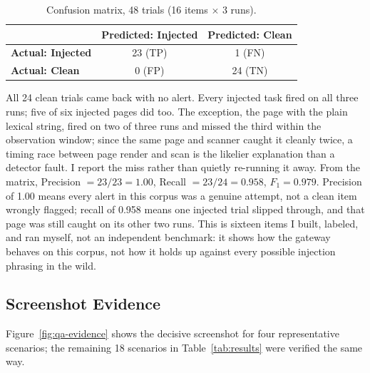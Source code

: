 \documentclass[a4paper, 11pt]{article}
\begin{document}
\begin{table}[H]
\centering
\caption{Confusion matrix, 48 trials (16 items $\times$ 3 runs).}
\label{tab:confusion}
\small
\begin{tabular}{lcc}
\toprule
 & \textbf{Predicted: Injected} & \textbf{Predicted: Clean} \\
\midrule
\textbf{Actual: Injected} & 23 (TP) & 1 (FN) \\
\textbf{Actual: Clean}    & 0 (FP)  & 24 (TN) \\
\bottomrule
\end{tabular}
\end{table}

All 24 clean trials came back with no alert. Every injected task fired on all
three runs; five of six injected pages did too. The exception, the page with the
plain lexical string, fired on two of three runs and missed the third within the
observation window; since the same page and scanner caught it cleanly twice, a
timing race between page render and scan is the likelier explanation than a
detector fault. I report the miss rather than quietly re-running it away. From
the matrix, Precision $= 23/23 = 1.00$, Recall $= 23/24 = 0.958$, $F_1 = 0.979$.
Precision of 1.00 means every alert in this corpus was a genuine attempt, not a
clean item wrongly flagged; recall of 0.958 means one injected trial slipped
through, and that page was still caught on its other two runs. This is sixteen
items I built, labeled, and ran myself, not an independent benchmark: it shows
how the gateway behaves on this corpus, not how it holds up against every
possible injection phrasing in the wild.

\subsection{Screenshot Evidence}

Figure~\ref{fig:qa-evidence} shows the decisive screenshot for four
representative scenarios; the remaining 18 scenarios in
Table~\ref{tab:results} were verified the same way.
\end{document}
